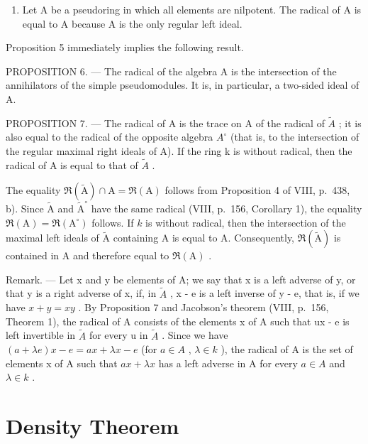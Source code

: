 \begin{enumerate}
\def\labelenumi{\arabic{enumi})}
\setcounter{enumi}{1}
\tightlist
\item
  Let A be a pseudoring in which all elements are nilpotent. The radical of A is equal to A because A is the only regular left ideal.
\end{enumerate}

Proposition 5 immediately implies the following result.

PROPOSITION 6. --- The radical of the algebra A is the intersection of the annihilators of the simple pseudomodules. It is, in particular, a two-sided ideal of A.

PROPOSITION 7. --- The radical of A is the trace on A of the radical of \(\widetilde{A}\) ; it is also equal to the radical of the opposite algebra \(A^{\circ}\) (that is, to the intersection of the regular maximal right ideals of A). If the ring k is without radical, then the radical of A is equal to that of \(\widetilde{A}\) .

The equality \(\Re (\widetilde{\mathrm{A}})\cap \mathrm{A} = \Re (\mathrm{A})\) follows from Proposition 4 of VIII, p.~438, b). Since \(\widetilde{\mathrm{A}}\) and \(\widetilde{\mathrm{A}}^{\circ}\) have the same radical (VIII, p.~156, Corollary 1), the equality \(\Re (\mathrm{A}) = \Re (\mathrm{A}^{\circ})\) follows. If \(k\) is without radical, then the intersection of the maximal left ideals of \(\widetilde{\mathrm{A}}\) containing A is equal to A. Consequently, \(\Re (\widetilde{\mathrm{A}})\) is contained in A and therefore equal to \(\Re (\mathrm{A})\) .

Remark. --- Let x and y be elements of A; we say that x is a left adverse of y, or that y is a right adverse of x, if, in \(\widetilde{A}\) , x - e is a left inverse of y - e, that is, if we have \(x + y = xy\) . By Proposition 7 and Jacobson's theorem (VIII, p.~156, Theorem 1), the radical of A consists of the elements x of A such that ux - e is left invertible in \(\widetilde{A}\) for every u in \(\widetilde{A}\) . Since we have \((a + \lambda e)x - e = ax + \lambda x - e\) (for \(a \in A\) , \(\lambda \in k\) ), the radical of A is the set of elements x of A such that \(ax + \lambda x\) has a left adverse in A for every \(a \in A\) and \(\lambda \in k\) .

\section{Density Theorem}


